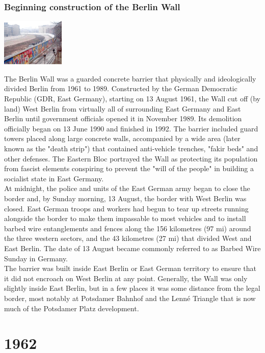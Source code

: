 \documentclass[11pt]{report}
\begin{document}
\subsection{Beginning construction of the Berlin Wall}
\vspace{2mm}\begin{center}\includegraphics[width=3cm]{./img/berlinWall.jpg}\end{center}
The Berlin Wall was a guarded concrete barrier that physically and ideologically divided Berlin from 1961 to 1989. Constructed by the German Democratic Republic (GDR, East Germany), starting on 13 August 1961, the Wall cut off (by land) West Berlin from virtually all of surrounding East Germany and East Berlin until government officials opened it in November 1989. Its demolition officially began on 13 June 1990 and finished in 1992. The barrier included guard towers placed along large concrete walls, accompanied by a wide area (later known as the "death strip") that contained anti-vehicle trenches, "fakir beds" and other defenses. The Eastern Bloc portrayed the Wall as protecting its population from fascist elements conspiring to prevent the "will of the people" in building a socialist state in East Germany.\\ \indent At midnight, the police and units of the East German army began to close the border and, by Sunday morning, 13 August, the border with West Berlin was closed. East German troops and workers had begun to tear up streets running alongside the border to make them impassable to most vehicles and to install barbed wire entanglements and fences along the 156 kilometres (97 mi) around the three western sectors, and the 43 kilometres (27 mi) that divided West and East Berlin. The date of 13 August became commonly referred to as Barbed Wire Sunday in Germany.\\
\indent The barrier was built inside East Berlin or East German territory to ensure that it did not encroach on West Berlin at any point. Generally, the Wall was only slightly inside East Berlin, but in a few places it was some distance from the legal border, most notably at Potsdamer Bahnhof and the Lenné Triangle that is now much of the Potsdamer Platz development.


\chapter{1962}
\end{document}
